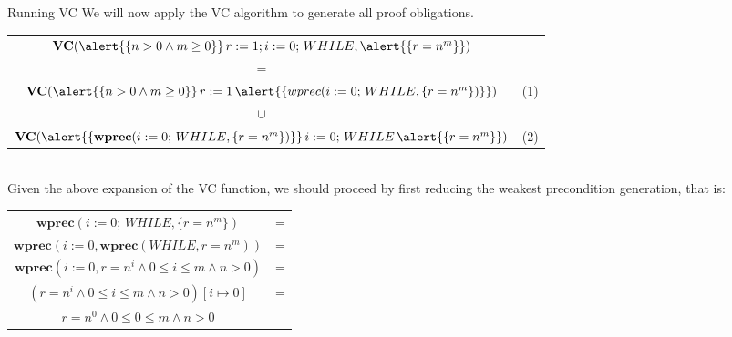 \documentclass[aspectratio=169]{beamer}
\begin{document}
\begin{slide}{Running VC}
We will now apply the VC algorithm to generate all proof obligations.\\\vspace{0.5cm}
\small{
\begin{tabular}{cc}
  $\textbf{VC}(\alert{\{n > 0 \land m \geq 0\}}\,r := 1;i := 0;\,WHILE,\alert{\{r = n^m\}})$  \\
  $=$\\
  $\textbf{VC}(\alert{\{n > 0 \land m \geq 0\}}\,r := 1\,\alert{\{wprec(i := 0;\,WHILE,\{r = n^m\})\}})$ & (1)\\
  $\cup$\\
  $\textbf{VC}(\alert{\{\textbf{wprec}(i := 0;\,WHILE,\{r = n^m\})\}}\,i := 0;\,WHILE\,\alert{\{r = n^m\}})$ & (2)
\end{tabular}}\\\vspace{0.5cm}
Given the above expansion of the VC function, we should proceed by first reducing the weakest precondition generation, that is:\\\begin{center}
\small{
\begin{tabular}{cc}
  $\textbf{wprec}(i := 0;\,WHILE,\{r = n^m\})$ & = \\
  $\textbf{wprec}(i := 0,\textbf{wprec}(WHILE,r = n^m))$ & =\\
  $\textbf{wprec}(i:=0,r = n^i \land 0 \leq i \leq m \land n > 0)$ & = \\
  $(r = n^i \land 0 \leq i \leq m \land n > 0)[i \mapsto 0]$ & =\\
  $r = n^0 \land 0 \leq 0 \leq m \land n > 0$
\end{tabular}}
\end{center}
\end{slide}
\end{document}
